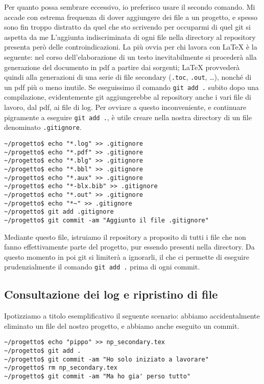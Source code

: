 \documentclass[a4paper,12pt,oneside]{article}
\begin{document}
Per quanto possa sembrare eccessivo, io preferisco usare il secondo comando.
Mi accade con estrema frequenza di
dover aggiungere dei file a un progetto, e spesso sono fin troppo
distratto da quel che sto scrivendo per occuparmi di quel git si aspetta da me
L'aggiunta indiscriminata di ogni file nella directory al repository presenta
però delle controindicazioni.
La più ovvia per chi lavora con \LaTeX{} è la seguente:
nel corso dell'elaborazione di un testo inevitabilmente si
procederà alla generazione del documento in pdf a partire dai sorgenti;
\LaTeX{} provvederà quindi alla generazioni di una serie di file secondary
(\lstinline|.toc|, \lstinline|.out|, \dots), nonché di un pdf più o meno inutile.
Se eseguissimo il comando \lstinline|git add .| subito dopo una compilazione,
evidentemente git aggiungerebbe al repository anche i vari file di lavoro, dal
pdf, ai file  di log. Per ovviare a questo inconveniente, e continuare
pigramente a eseguire \lstinline|git add .|, è utile creare nella nostra
directory di un file denominato \lstinline|.gitignore|.
\begin{lstlisting}
~/progetto$ echo "*.log" >> .gitignore
~/progetto$ echo "*.pdf" >> .gitignore
~/progetto$ echo "*.blg" >> .gitignore
~/progetto$ echo "*.bbl" >> .gitignore
~/progetto$ echo "*.aux" >> .gitignore
~/progetto$ echo "*-blx.bib" >> .gitignore
~/progetto$ echo "*.out" >> .gitignore
~/progetto$ echo "*~" >> .gitignore
~/progetto$ git add .gitignore
~/progetto$ git commit -am "Aggiunto il file .gitignore"
\end{lstlisting}

Mediante questo file, istruiamo il repository a proposito di tutti i
file che non fanno effettivamente parte del progetto, pur essendo presenti
nella directory.
Da questo momento in poi git si limiterà a ignorarli, il che ci permette di
eseguire prudenzialmente il comando \lstinline|git add .| prima di ogni commit.

\subsection{Consultazione dei log e ripristino di file}
Ipotizziamo a titolo esemplificativo il seguente scenario:
abbiamo accidentalmente eliminato un file del nostro
progetto, e abbiamo anche eseguito un commit.
\begin{lstlisting}
~/progetto$ echo "pippo" >> np_secondary.tex
~/progetto$ git add .
~/progetto$ git commit -am "Ho solo iniziato a lavorare"
~/progetto$ rm np_secondary.tex
~/progetto$ git commit -am "Ma ho gia' perso tutto"
\end{lstlisting}
\end{document}
